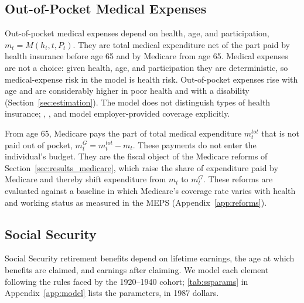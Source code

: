 \subsection{Out-of-Pocket Medical Expenses}\label{sec:model_medical}

Out-of-pocket medical expenses depend on health, age, and participation, $m_t=M(h_t,t,P_t)$. They are total medical expenditure net of the part paid by health insurance before age 65 and by Medicare from age 65. Medical expenses are not a choice: given health, age, and participation they are deterministic, so medical-expense risk in the model is health risk. Out-of-pocket expenses rise with age and are considerably higher in poor health and with a disability (Section~\ref{sec:estimation}). The model does not distinguish types of health insurance; \citet{Blau2008b}, \citet{french2011effects}, and \citet{Imrohoroglu2012} model employer-provided coverage explicitly.

From age 65, Medicare pays the part of total medical expenditure $m^{tot}_t$ that is not paid out of pocket, $m^G_t=m^{tot}_t-m_t$. These payments do not enter the individual's budget. They are the fiscal object of the Medicare reforms of Section~\ref{sec:results_medicare}, which raise the share of expenditure paid by Medicare and thereby shift expenditure from $m_t$ to $m^G_t$. These reforms are evaluated against a baseline in which Medicare's coverage rate varies with health and working status as measured in the MEPS (Appendix~\ref{app:reforms}).

\subsection{Social Security}\label{sec:model_ss}

Social Security retirement benefits depend on lifetime earnings, the age at which benefits are claimed, and earnings after claiming. We model each element following the rules faced by the 1920--1940 cohort; \autoref{tab:ssparams} in Appendix~\ref{app:model} lists the parameters, in 1987 dollars.

